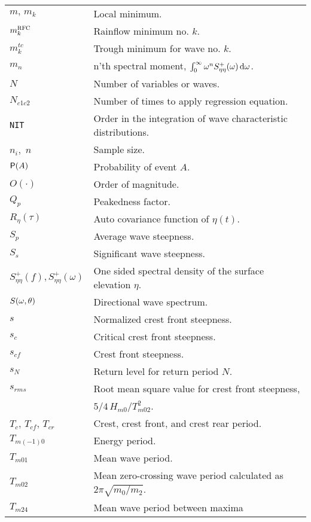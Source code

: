 \begin{tabular}{p{23mm}p{125mm}}
 $m,\,m_{k}$        & Local minimum.\\
 $m_{k}^{{\protect\mbox{\protect\small\protect\sc rfc}}}$  & Rainflow minimum no. $k$.\\
 $m_{k}^{tc}$   & Trough minimum for wave no. $k$.\\
  $m_{n}$ & n'th spectral moment, %
          $\int_{0}^{\infty}\omega^{n}  S_{\eta
          \eta}^{+}(\omega) \,\mathrm{d}\omega$.\\
 $N$ & Number of variables or waves.\\
 $N_{c1c2}$ & Number of times to apply regression equation.\\
 {\tt NIT} & Order in the integration of wave characteristic distributions.\\
 $n_{i},$ $n$ & Sample size.\\
 $\mbox{\sf P}(A)$ & Probability of event $A$.\\
 $O(\cdot)$ & Order of magnitude.\\
 $Q_p$ & Peakedness factor. \\
  $R_{\eta}(\tau)$            & Auto covariance function of
  $\eta(t)$. \\
  $S_{p}$ & Average wave steepness.\\
  $S_s$ & Significant wave steepness. \\
  $S_{\eta \eta}^{+}(f),  %
  S_{\eta \eta}^{+}(\omega)$ & One sided spectral density of the
  surface elevation $\eta$. \\
  $S(\omega ,\theta)$ & Directional wave spectrum. \\
$s$ & Normalized crest front steepness.\\
$s_{c}$   & Critical crest front steepness. \\
$s_{cf}$  & Crest front steepness. \\
$s_N$ & Return level for return period $N$.  \\
$s_{rms}$ & Root mean square value for crest front steepness, \\
 & \ie{}
   $5/4\,H_{m0}/T_{m02}^{2}$.  \\
  $T_{c}$, $T_{cf}$, $T_{cr}$ & Crest, crest front, and crest rear
  period. \\
  $T_{m(-1)0}$ & Energy period. \\
  $T_{m01}$ & Mean wave period. \\
  $T_{m02}$                   & Mean zero-crossing wave period
                calculated as $2\pi\sqrt{m_{0}/m_{2}}$. \\
  $T_{m24}$                   & Mean wave period between maxima

\end{tabular}
